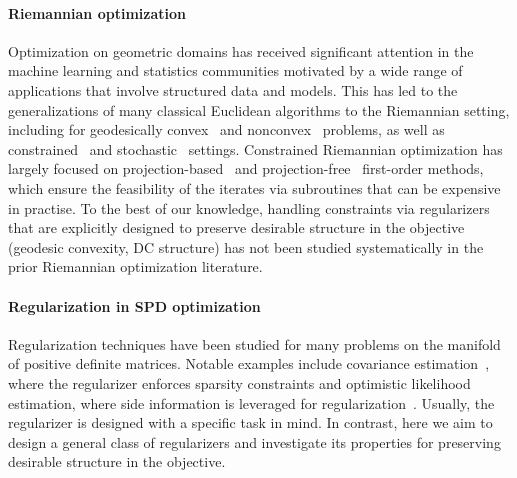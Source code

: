 \documentclass[sn-nature]{sn-jnl}%
\theoremstyle{thmstyleone}%
\theoremstyle{thmstyletwo}%
\theoremstyle{thmstylethree}%
\begin{document}
\paragraph{Riemannian optimization} Optimization on geometric domains has received significant attention in the machine learning and statistics communities motivated by a wide range of applications that involve structured data and models. This has led to the generalizations of many classical Euclidean algorithms to the Riemannian setting, including for geodesically convex~\citep{udriste1994convex,Bacak+2014,zhang2016first} and nonconvex~\citep{boumal2019global} problems, as well as constrained~\citep{frank-wolfe,liu2019simple} and stochastic~\citep{bonnabel2013stochastic,zhang2016first,Riemannian_SVRG,weber2021projection} settings. Constrained Riemannian optimization has largely focused on projection-based~\citep{liu2019simple} and projection-free~\citep{frank-wolfe} first-order methods, which ensure the feasibility of the iterates via subroutines that can be expensive in practise. To the best of our knowledge, handling constraints via regularizers that are explicitly designed to preserve desirable structure in the objective (geodesic convexity, DC structure) has not been studied systematically in the prior Riemannian optimization literature.

\paragraph{Regularization in SPD optimization} 
Regularization techniques have been studied for many problems on the manifold of positive definite matrices. Notable examples include covariance estimation~\citep{bien,structuredcovestimation_wiesel}, where the regularizer enforces sparsity constraints and 
optimistic likelihood estimation, where side information is leveraged for regularization~\citep{Nguyen2019CalculatingOL}. Usually, the regularizer is designed with a specific task in mind. In contrast, here we aim to design a general class of regularizers and investigate its properties for preserving desirable structure in the objective. %


\end{document}
